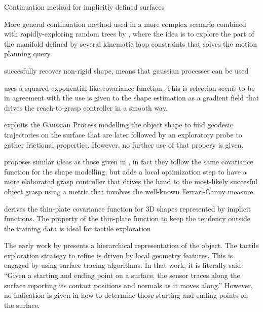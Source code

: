 Continuation method for implicitly defined surfaces \citet{Henderson1993COMPUTING}

More general continuation method used in a more complex scenario combined with rapidly-exploring random trees \citep{LaValle2011Motion} by \citet{Jaillet2013Path}, where the idea is to explore the part of the manifold defined by several kinematic loop constraints that solves the motion planning query.

\citet{Zhu2009Nonrigid} succesfully recover non-rigid shape, means that gaussian processes can be used

\citet{Dragiev2011Gaussian} uses a squared-exponential-like covariance function. This is selection seems to be in agreement with the use is given to the shape estimation as a gradient field that drives the reach-to-grasp controller in a smooth way.

\citet{Rosales2014Active} exploits the Gaussian Process modelling the object shape to find geodesic trajectories on the surface that are later followed by an exploratory probe to gather frictional properties. However, no further use of that propery is given.

\citet{Mahler2015Grasp} proposes similar ideas as those given in \citet{Dragiev2011Gaussian}, in fact they follow the same covariance function for the shape modelling, but adds a local optimization step to have a more elaborated grasp controller that drives the hand to the most-likely succesful object grasp using a metric that involves the well-known Ferrari-Canny measure.

\citet{Williams2007Gaussian} derives the thin-plate covariance function for 3D shapes represented by implicit functions. The property of the thin-plate function to keep the tendency outside the training data is ideal for tactile exploration~\citep[Fig.~2]{Williams2007Gaussian}

The early work by \citet{Allen1987Robotic} presents a hierarchical representation of the object. The tactile exploration strategy to refine is driven by local geometry features. This is engaged by using surface tracing algorithms. In that work, it is literally said: ``Given a starting and ending point on a surface, the sensor traces along the surface reporting its contact positions and normals as it moves along.'' However, no indication is given in how to determine those starting and ending points on the surface.

